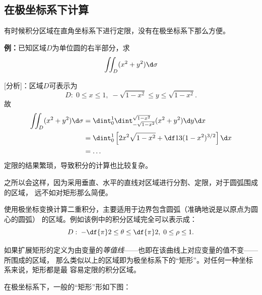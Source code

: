 \subsection{在极坐标系下计算}

有时候积分区域在直角坐标系下进行定限，没有在极坐标系下那么方便。

{\bf 例：}已知区域$D$为单位圆的右半部分，求
$$\iint_D(x^2+y^2)\d\sigma$$

[分析]：区域$D$可表示为
$$D:\;0\leq x\leq 1,\;-\sqrt{1-x^2}\leq y\leq\sqrt{1-x^2}.$$
故
\begin{align*}
	\iint_D(x^2+y^2)\d\sigma
	&=\dint_0^1\dint_{-\sqrt{1-x^2}}^{\sqrt{1-x^2}}(x^2+y^2)\d y\d x\\
	&=\dint_0^1\left[2x^2\sqrt{1-x^2}+\df13(1-x^2)^{3/2}\right]\d x\\
	&=\ldots
\end{align*}
定限的结果繁琐，导致积分的计算也比较复杂。

之所以会这样，因为采用垂直、水平的直线对区域进行分割、定限，对于圆弧围成的区域，
远不如对矩形那么简便。

使用极坐标变换计算二重积分，主要适用于边界包含圆弧（准确地说是以原点为圆心的圆弧）
的区域。例如该例中的积分区域完全可以表示成：
$$D:\;-\df{\pi}2\leq\theta\leq\df{\pi}2,
\;0\leq\rho\leq1.$$

如果扩展矩形的定义为由变量的{\it 等值线}——也即在该曲线上对应变量的值不变——所围成的区域，
那么类似以上的区域即为极坐标系下的“矩形”。对任何一种坐标系来说，矩形都是最
容易定限的积分区域。

在极坐标系下，一般的“矩形”形如下图：

\begin{center}
\end{center}

